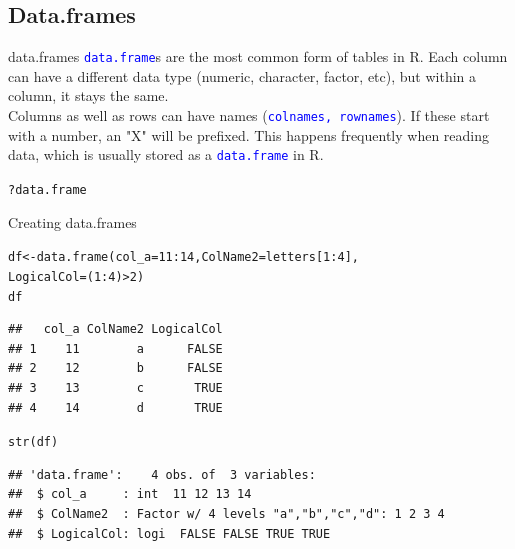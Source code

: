 \documentclass[xcolor=table,           xcolor=dvipsnames]{beamer}\usepackage[]{graphicx}\usepackage[]{color}
\makeatletter
\newcommand{\hlnum}[1]{\textcolor[rgb]{0,0,0}{#1}}
\newcommand{\hlopt}[1]{\textcolor[rgb]{0,0,0}{#1}}
\newcommand{\hlstd}[1]{\textcolor[rgb]{0,0,0}{#1}}
\newcommand{\hlkwb}[1]{\textcolor[rgb]{0,0,0}{#1}}
\newcommand{\hlkwc}[1]{\textcolor[rgb]{1,0,1}{#1}}
\newcommand{\hlkwd}[1]{\textcolor[rgb]{0,0,1}{#1}}
\newenvironment{kframe}{%
 \def\at@end@of@kframe{}%
 \ifinner\ifhmode%
  \def\at@end@of@kframe{\end{minipage}}%
  \begin{minipage}{\columnwidth}%
 \fi\fi%
 \def\FrameCommand##1{\hskip\@totalleftmargin \hskip-\fboxsep
 \colorbox{shadecolor}{##1}\hskip-\fboxsep
     \hskip-\linewidth \hskip-\@totalleftmargin \hskip\columnwidth}%
 \MakeFramed {\advance\hsize-\width
   \@totalleftmargin\z@ \linewidth\hsize
   \@setminipage}}%
 {\par\unskip\endMakeFramed%
 \at@end@of@kframe}
\newenvironment{knitrout}{}{} %
\newcommand{\rcode}[1]{\texttt{\textcolor{Blue}{#1}}} %
\makeatother
\begin{document}
\subsection{Data.frames}

\begin{frame}[fragile]{data.frames}
\rcode{data.frame}s are the most common form of tables in R.  Each column can have a different data type (numeric, character, factor, etc), but within a column, it stays the same.\\
Columns as well as rows can have names (\rcode{colnames, rownames}). If these start with a number, an "X" will be prefixed.  This happens frequently when reading data, which is usually stored as a \rcode{data.frame} in R.\\
\begin{knitrout}
\color{fgcolor}\begin{kframe}
\begin{alltt}
\hlopt{?}\hlstd{data.frame}
\end{alltt}
\end{kframe}
\end{knitrout}
\end{frame}


\begin{frame}[fragile]{Creating data.frames}
\begin{knitrout}\small
{}\color{fgcolor}\begin{kframe}
\begin{alltt}
\hlstd{df} \hlkwb{<-} \hlkwd{data.frame}\hlstd{(}\hlkwc{col_a}\hlstd{=}\hlnum{11}\hlopt{:}\hlnum{14}\hlstd{,} \hlkwc{ColName2}\hlstd{=letters[}\hlnum{1}\hlopt{:}\hlnum{4}\hlstd{],}
                 \hlkwc{LogicalCol}\hlstd{=(}\hlnum{1}\hlopt{:}\hlnum{4}\hlstd{)}\hlopt{>}\hlnum{2}\hlstd{)}
\hlstd{df}
\end{alltt}
\begin{verbatim}
##   col_a ColName2 LogicalCol
## 1    11        a      FALSE
## 2    12        b      FALSE
## 3    13        c       TRUE
## 4    14        d       TRUE
\end{verbatim}
\begin{alltt}
\hlkwd{str}\hlstd{(df)}
\end{alltt}
\begin{verbatim}
## 'data.frame':	4 obs. of  3 variables:
##  $ col_a     : int  11 12 13 14
##  $ ColName2  : Factor w/ 4 levels "a","b","c","d": 1 2 3 4
##  $ LogicalCol: logi  FALSE FALSE TRUE TRUE
\end{verbatim}
\end{kframe}
\end{knitrout}
\end{frame}
\end{document}
